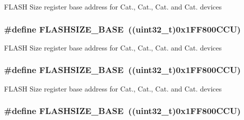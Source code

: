 F\-L\-A\-S\-H Size register base address for Cat., Cat., Cat. and Cat. devices \hypertarget{group___peripheral__memory__map_ga776d985f2d4d40b588ef6ca9d573af78}{
\subsubsection[{F\-L\-A\-S\-H\-S\-I\-Z\-E\-\_\-\-B\-A\-S\-E}]{\setlength{\rightskip}{0pt plus 5cm}\#define F\-L\-A\-S\-H\-S\-I\-Z\-E\-\_\-\-B\-A\-S\-E~((uint32\-\_\-t)0x1\-F\-F800\-C\-C\-U)}}\label{group___peripheral__memory__map_ga776d985f2d4d40b588ef6ca9d573af78}
F\-L\-A\-S\-H Size register base address for Cat., Cat., Cat. and Cat. devices \hypertarget{group___peripheral__memory__map_ga776d985f2d4d40b588ef6ca9d573af78}{
\subsubsection[{F\-L\-A\-S\-H\-S\-I\-Z\-E\-\_\-\-B\-A\-S\-E}]{\setlength{\rightskip}{0pt plus 5cm}\#define F\-L\-A\-S\-H\-S\-I\-Z\-E\-\_\-\-B\-A\-S\-E~((uint32\-\_\-t)0x1\-F\-F800\-C\-C\-U)}}\label{group___peripheral__memory__map_ga776d985f2d4d40b588ef6ca9d573af78}
F\-L\-A\-S\-H Size register base address for Cat., Cat., Cat. and Cat. devices \hypertarget{group___peripheral__memory__map_ga776d985f2d4d40b588ef6ca9d573af78}{
\subsubsection[{F\-L\-A\-S\-H\-S\-I\-Z\-E\-\_\-\-B\-A\-S\-E}]{\setlength{\rightskip}{0pt plus 5cm}\#define F\-L\-A\-S\-H\-S\-I\-Z\-E\-\_\-\-B\-A\-S\-E~((uint32\-\_\-t)0x1\-F\-F800\-C\-C\-U)}}\label{group___peripheral__memory__map_ga776d985f2d4d40b588ef6ca9d573af78}

